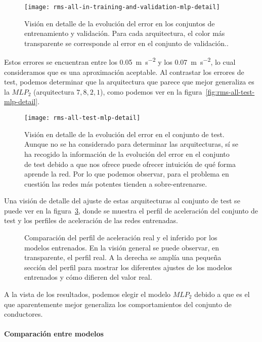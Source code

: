 \begin{figure}
	\centering
	\texttt{[image: rms-all-in-training-and-validation-mlp-detail]}
	\caption[Evolución del error en entrenamiento en los \ac{mlp} para las arquitecturas seleccionadas]{Visión en detalle de la evolución del error en los conjuntos de entrenamiento y validación. Para cada arquitectura, el color más transparente se corresponde al error en el conjunto de validación..}
	\label{fig:rms-all-in-training-and-validation-mlp-detail}
\end{figure}

Estos errores se encuentran entre los \SI{0.05}{\metre\per\square\second} y los \SI{0.07}{\metre\per\square\second}, lo cual consideramos que es una aproximación aceptable. Al contrastar los errores de test, podemos determinar que la arquitectura que parece que mejor generaliza es la $MLP_2$ (arquitectura $7, 8, 2, 1$), como podemos ver en la figura~\ref{fig:rms-all-test-mlp-detail}.

\begin{figure}
	\centering
	\texttt{[image: rms-all-test-mlp-detail]}
	\caption[Evolución del error en el conjunto de test durante el entrenamiento]{Visión en detalle de la evolución del error en el conjunto de test. Aunque no se ha considerado para determinar las arquitecturas, sí se ha recogido la información de la evolución del error en el conjunto de test debido a que nos ofrece puede ofrecer intuición de qué forma aprende la red. Por lo que podemos observar, para el problema en cuestión las redes más potentes tienden a sobre-entrenarse.}
	\label{rms-all-test-mlp-detail}
\end{figure}

Una visión de detalle del ajuste de estas arquitecturas al conjunto de test se puede ver en la figura~\ref{fig:mlp-test-comparisons}, donde se muestra el perfil de aceleración del conjunto de test y los perfiles de aceleración de las redes entrenadas.

\begin{figure}
	\centering
	\qquad
	\caption[Comparación del perfil de aceleración real y el inferido por los modelos entrenados]{Comparación del perfil de aceleración real y el inferido por los modelos entrenados. En la visión general se puede observar, en transparente, el perfil real. A la derecha se amplía una pequeña sección del perfil para mostrar los diferentes ajustes de los modelos entrenados y cómo difieren del valor real.}
	\label{fig:mlp-test-comparisons}
\end{figure}

A la vista de los resultados, podemos elegir el modelo $MLP_2$ debido a que es el que aparentemente mejor generaliza los comportamientos del conjunto de conductores.

\paragraph{Comparación entre modelos}

